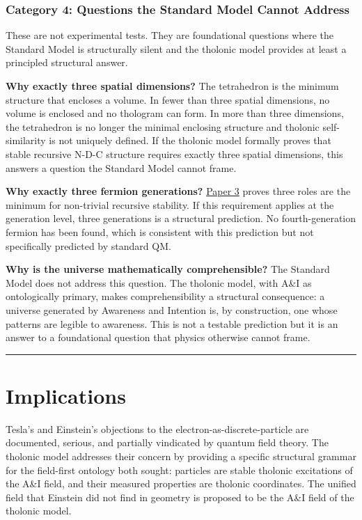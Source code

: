 \documentclass[12pt]{article}
\begin{document}
\subsubsection{Category 4: Questions the Standard Model Cannot
Address}\label{category-4-questions-the-standard-model-cannot-address}

These are not experimental tests. They are foundational questions where
the Standard Model is structurally silent and the tholonic model
provides at least a principled structural answer.

\textbf{Why exactly three spatial dimensions?} The tetrahedron is the
minimum structure that encloses a volume. In fewer than three spatial
dimensions, no volume is enclosed and no thologram can form. In more
than three dimensions, the tetrahedron is no longer the minimal
enclosing structure and tholonic self-similarity is not uniquely
defined. If the tholonic model formally proves that stable recursive
N-D-C structure requires exactly three spatial dimensions, this answers
a question the Standard Model cannot frame.

\textbf{Why exactly three fermion generations?}
\href{https://github.com/baardev/truevalue/blob/main/docnav/Research/papers/3_minimal-recursive-triadic-framework/3_minimal-recursive-triadic-framework.pdf}{Paper
3} proves three roles are the minimum for non-trivial recursive
stability. If this requirement applies at the generation level, three
generations is a structural prediction. No fourth-generation fermion has
been found, which is consistent with this prediction but not
specifically predicted by standard QM.

\textbf{Why is the universe mathematically comprehensible?} The Standard
Model does not address this question. The tholonic model, with A\&I as
ontologically primary, makes comprehensibility a structural consequence:
a universe generated by Awareness and Intention is, by construction, one
whose patterns are legible to awareness. This is not a testable
prediction but it is an answer to a foundational question that physics
otherwise cannot frame.

\begin{center}\rule{0.5\linewidth}{0.5pt}\end{center}

\section{Implications}\label{implications}

Tesla's and Einstein's objections to the electron-as-discrete-particle
are documented, serious, and partially vindicated by quantum field
theory. The tholonic model addresses their concern by providing a
specific structural grammar for the field-first ontology both sought:
particles are stable tholonic excitations of the A\&I field, and their
measured properties are tholonic coordinates. The unified field that
Einstein did not find in geometry is proposed to be the A\&I field of
the tholonic model.
\end{document}
